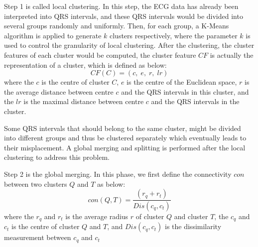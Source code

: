 \documentclass[conference]{IEEEtran}
\begin{document}
Step 1 is called local clustering. In this step, the ECG data has already been interpreted into QRS intervals, and these QRS intervals would be divided into several groups randomly and uniformly. Then, for each group, a K-Means algorithm is applied to generate $ k $ clusters respectively, where the parameter $ k $ is used to control the granularity of local clustering. After the clustering, the cluster features of each cluster would be computed, the cluster feature $ CF $ is actually the representation of a cluster, which is defined as below:
\begin{equation}
CF(C) = (c, \; e, \; r, \; lr)
\end{equation} 
where the $ c $ is the centre of cluster $ C $, $ e $ is the centre of the Euclidean space, $ r $ is the average distance between centre $ c $ and the QRS intervals in this cluster, and the $ lr $ is the maximal distance between centre $ c $ and the QRS intervals in the cluster. 


Some QRS intervals that should belong to the same cluster,  might be divided into different groups and thus be clustered separately which eventually leads to their misplacement. A global merging and splitting is performed after the local clustering to address this problem. 


Step 2 is the global merging. In this phase, we first define the connectivity $ con $ between two clusters $ Q $ and $ T $ as below:
\begin{equation}\label{eq_connectivity}
con(Q, T) = \frac{(r_q + r_t)}{Dis(c_q, c_t)} 
\end{equation}
where the $ r_q $ and $ r_t $ is the average radius $ r $ of cluster $ Q $ and cluster $ T $, the $ c_q $ and $ c_t $ is the centre of cluster $ Q $ and $ T $, and $ Dis(c_q, c_t) $ is the dissimilarity measurement between $ c_q $ and $ c_t $
\end{document}
